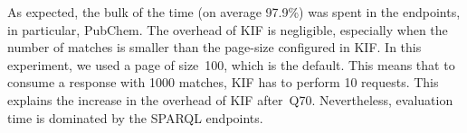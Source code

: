 As expected, the bulk of the time (on average 97.9\%) was spent in the endpoints, in particular, PubChem.
The overhead of KIF is negligible, especially when the number of matches is smaller than the page-size configured in KIF\@.
In this experiment, we used a page of size~100, which is the default.
This means that to consume a response with 1000 matches, KIF has to perform 10 requests.
This explains the increase in the overhead of KIF after~Q70.
Nevertheless, evaluation time is dominated by the SPARQL endpoints.





